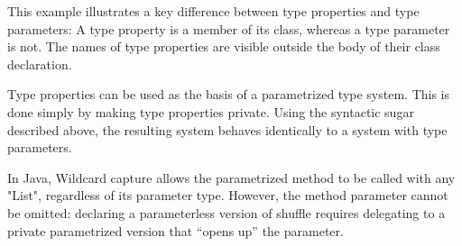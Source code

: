 \documentclass[preprint,nocopyrightspace,9pt]{sigplanconf}
\begin{document}
This example illustrates a key difference between type properties
and type parameters:
A type property is a member of its class, whereas a type parameter is
not.  The names of type properties are visible outside the body of
their class declaration.

Type properties can be used as the basis of a parametrized type
system.  This is done simply by making type properties private.
Using the syntactic sugar described above,
the resulting system behaves identically to a system with type
parameters.
\fi

In Java,
Wildcard
capture allows the parametrized method to be called with any \xcd"List",
regardless of its parameter type.
However,
the method parameter cannot be omitted: declaring a parameterless version
of shuffle requires delegating to a private parametrized version that
``opens up'' the parameter.
\end{document}
